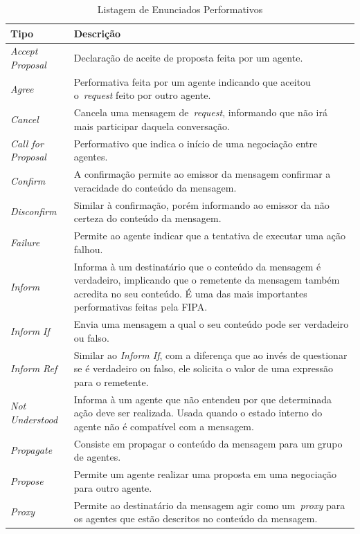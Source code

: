 \begin{table}
	\caption{Listagem de Enunciados Performativos}
	\begin{tabular}{|p{3cm} | p{12cm} |}
		\hline
		\textbf{Tipo}	& \textbf{Descrição}	\\
		\hline
		\emph{Accept Proposal} & Declaração de aceite de proposta feita por um agente.	\\
		\hline
		\emph{Agree} & Performativa feita por um agente indicando que aceitou o~\emph{request} feito por outro agente.	\\
		\hline
		\emph{Cancel} &	Cancela uma mensagem de~\emph{request}, informando que não irá mais participar daquela conversação.  \\
		\hline
		\emph{Call for Proposal} & Performativo que indica o início de uma negociação entre agentes.	\\
		\hline
		\emph{Confirm} & A confirmação permite ao emissor da mensagem confirmar a veracidade do conteúdo da mensagem.	\\
		\hline
		\emph{Disconfirm} & Similar à confirmação, porém informando ao emissor da não certeza do conteúdo da mensagem.	\\
		\hline
		\emph{Failure} & Permite ao agente indicar que a tentativa de executar uma ação falhou.	\\
		\hline
		\emph{Inform} & Informa à um destinatário que o conteúdo da mensagem é verdadeiro, implicando que o remetente da mensagem também acredita no seu conteúdo. É uma das mais importantes performativas feitas pela FIPA.	\\
		\hline
		\emph{Inform If} & Envia uma mensagem a qual o seu conteúdo pode ser verdadeiro ou falso.	\\
		\hline
		\emph{Inform Ref} & Similar ao \emph{Inform If}, com a diferença que ao invés de questionar se é verdadeiro ou falso, ele solicita o valor de uma expressão para o remetente.	\\
		\hline
		\emph{Not Understood} & Informa à um agente que não entendeu por que determinada ação deve ser realizada. Usada quando o estado interno do agente não é compatível com a mensagem.	\\
		\hline
		\emph{Propagate} & Consiste em propagar o conteúdo da mensagem para um grupo de agentes.	\\
		\hline
		\emph{Propose} & Permite um agente realizar uma proposta em uma negociação para outro agente.	\\
		\hline
		\emph{Proxy} & Permite ao destinatário da mensagem agir como um~\emph{proxy} para os agentes que estão descritos no conteúdo da mensagem.	\\

\end{tabular}
\end{table}
